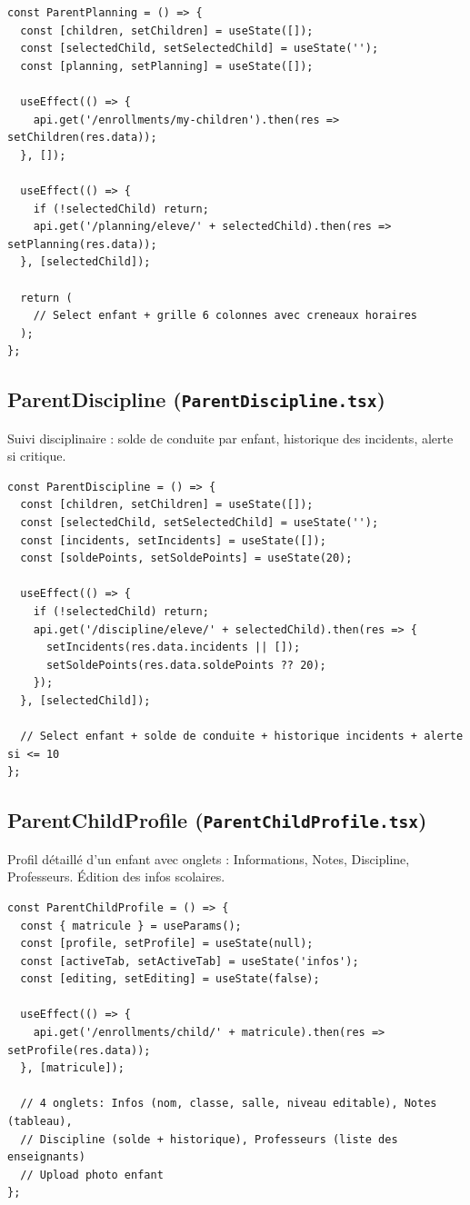 \documentclass[12pt,a4paper]{article}
\begin{document}
\begin{lstlisting}[style=code]
const ParentPlanning = () => {
  const [children, setChildren] = useState([]);
  const [selectedChild, setSelectedChild] = useState('');
  const [planning, setPlanning] = useState([]);

  useEffect(() => {
    api.get('/enrollments/my-children').then(res => setChildren(res.data));
  }, []);

  useEffect(() => {
    if (!selectedChild) return;
    api.get('/planning/eleve/' + selectedChild).then(res => setPlanning(res.data));
  }, [selectedChild]);

  return (
    // Select enfant + grille 6 colonnes avec creneaux horaires
  );
};
\end{lstlisting}

\subsection{ParentDiscipline (\texttt{ParentDiscipline.tsx})}

Suivi disciplinaire : solde de conduite par enfant, historique des incidents, alerte si critique.

\begin{lstlisting}[style=code]
const ParentDiscipline = () => {
  const [children, setChildren] = useState([]);
  const [selectedChild, setSelectedChild] = useState('');
  const [incidents, setIncidents] = useState([]);
  const [soldePoints, setSoldePoints] = useState(20);

  useEffect(() => {
    if (!selectedChild) return;
    api.get('/discipline/eleve/' + selectedChild).then(res => {
      setIncidents(res.data.incidents || []);
      setSoldePoints(res.data.soldePoints ?? 20);
    });
  }, [selectedChild]);

  // Select enfant + solde de conduite + historique incidents + alerte si <= 10
};
\end{lstlisting}

\subsection{ParentChildProfile (\texttt{ParentChildProfile.tsx})}

Profil détaillé d'un enfant avec onglets : Informations, Notes, Discipline, Professeurs. Édition des infos scolaires.

\begin{lstlisting}[style=code]
const ParentChildProfile = () => {
  const { matricule } = useParams();
  const [profile, setProfile] = useState(null);
  const [activeTab, setActiveTab] = useState('infos');
  const [editing, setEditing] = useState(false);

  useEffect(() => {
    api.get('/enrollments/child/' + matricule).then(res => setProfile(res.data));
  }, [matricule]);

  // 4 onglets: Infos (nom, classe, salle, niveau editable), Notes (tableau),
  // Discipline (solde + historique), Professeurs (liste des enseignants)
  // Upload photo enfant
};
\end{lstlisting}
\end{document}
